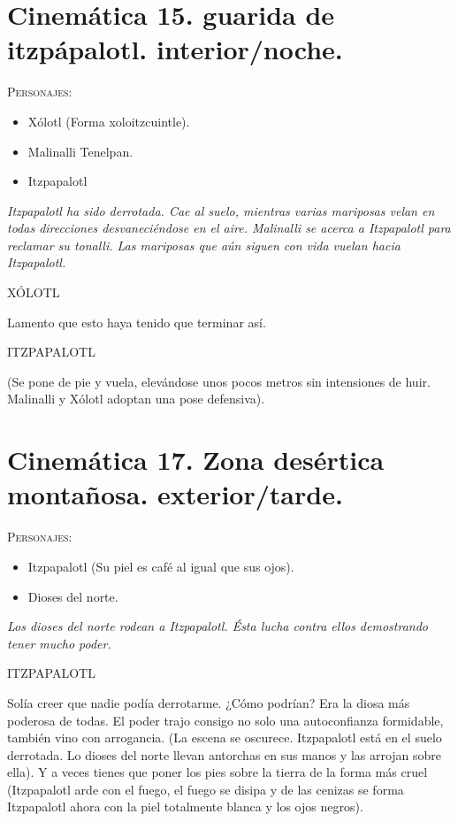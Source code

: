 \documentclass[11pt,letterpaper]{article}
\begin{document}
 \section{Cinemática 15. guarida de itzpápalotl. interior/noche.}
  \textsc{Personajes}:
  \begin{itemize}
   \item Xólotl (Forma xoloitzcuintle).
	\item Malinalli Tenelpan.
	\item Itzpapalotl
  \end{itemize}
\textit{Itzpapalotl ha sido derrotada. Cae al suelo, mientras varias mariposas velan en todas direcciones desvaneciéndose en el aire. Malinalli se acerca a Itzpapalotl para reclamar su tonalli. Las mariposas que aún siguen con vida vuelan hacia Itzpapalotl.}
\begin{center}
XÓLOTL
\\
\par
Lamento que esto haya tenido que terminar así.
\\
\par
ITZPAPALOTL
\\
\par 
(Se pone de pie y vuela, elevándose unos pocos metros sin intensiones de huir. Malinalli y Xólotl adoptan una pose defensiva).
\end{center}

\section{Cinemática 17. Zona desértica montañosa. exterior/tarde.}
\textsc{Personajes}:
\begin{itemize}
\item Itzpapalotl (Su piel es café al igual que sus ojos).
\item Dioses del norte.
\end{itemize}
\textit{Los dioses del norte rodean a Itzpapalotl. Ésta lucha contra ellos demostrando tener mucho poder.}
\begin{center}
ITZPAPALOTL
\\
\par
Solía creer que nadie podía derrotarme. ¿Cómo podrían? Era la diosa más poderosa de todas. El poder trajo consigo no solo una autoconfianza formidable, también vino con arrogancia. (La escena se oscurece. Itzpapalotl está en el suelo derrotada. Lo dioses del norte llevan antorchas en sus manos y las arrojan sobre ella). Y a veces tienes que poner los pies sobre la tierra de la forma más cruel (Itzpapalotl arde con el fuego, el fuego se disipa y de las cenizas se forma Itzpapalotl ahora con la piel totalmente blanca y los ojos negros). 
\end{center}
\end{document}
